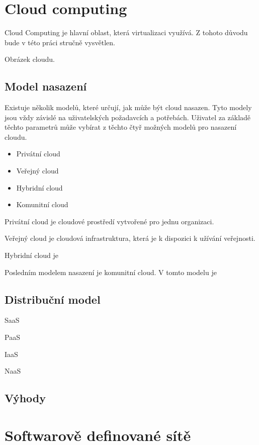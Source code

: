 \section{Cloud computing}\label{sub:interaction}

Cloud Computing je hlavní oblast, která virtualizaci využívá. Z tohoto důvodu bude v této práci stručně vysvětlen. 

Obrázek cloudu.


\subsection{Model nasazení}

Existuje několik modelů, které určují, jak může být cloud nasazen. Tyto modely jsou vždy závislé na uživatelských požadavcích a potřebách. Uživatel za základě těchto parametrů může vybírat z těchto čtyř možných modelů pro nasazení cloudu.
\begin{itemize}
\item Privátní cloud
\item Veřejný cloud
\item Hybridní cloud
\item Komunitní cloud
\end{itemize}

Privátní cloud je cloudové prostředí vytvořené pro jednu organizaci. 

Veřejný cloud je cloudová infrastruktura, která je k dispozici k užívání veřejnosti. 

Hybridní cloud je 

Posledním modelem nasazení je komunitní cloud. V tomto modelu je 

\subsection{Distribuční model}

SaaS

PaaS

IaaS

NaaS

\subsection{Výhody}

\section{Softwarově definované sítě}\label{sub:interaction}

